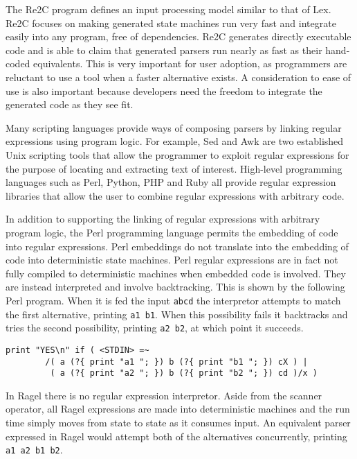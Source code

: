 \documentclass[letterpaper,11pt,oneside]{book}
\newcommand{\verbspace}{\vspace{10pt}}
\newenvironment{inline_code}{\def\baselinestretch{1}\vspace{12pt}\small}{}
\begin{document}
The Re2C program defines an input processing model similar to that of Lex.
Re2C focuses on making generated state machines run very fast and
integrate easily into any program, free of dependencies.  Re2C generates
directly executable code and is able to claim that generated parsers run nearly
as fast as their hand-coded equivalents.  This is very important for user
adoption, as programmers are reluctant to use a tool when a faster alternative
exists.  A consideration to ease of use is also important because developers
need the freedom to integrate the generated code as they see fit. 

Many scripting languages provide ways of composing parsers by linking regular
expressions using program logic. For example, Sed and Awk are two established
Unix scripting tools that allow the programmer to exploit regular expressions
for the purpose of locating and extracting text of interest. High-level
programming languages such as Perl, Python, PHP and Ruby all provide regular
expression libraries that allow the user to combine regular expressions with
arbitrary code.

In addition to supporting the linking of regular expressions with arbitrary
program logic, the Perl programming language permits the embedding of code into
regular expressions. Perl embeddings do not translate into the embedding of
code into deterministic state machines. Perl regular expressions are in fact
not fully compiled to deterministic machines when embedded code is involved.
They are instead interpreted and involve backtracking. This is shown by the
following Perl program. When it is fed the input \verb|abcd| the interpretor
attempts to match the first alternative, printing \verb|a1 b1|.  When this
possibility fails it backtracks and tries the second possibility, printing
\verb|a2 b2|, at which point it succeeds.

\begin{inline_code}
\begin{verbatim}
print "YES\n" if ( <STDIN> =~
        /( a (?{ print "a1 "; }) b (?{ print "b1 "; }) cX ) |
         ( a (?{ print "a2 "; }) b (?{ print "b2 "; }) cd )/x )
\end{verbatim}
\end{inline_code}
\verbspace

In Ragel there is no regular expression interpretor. Aside from the scanner
operator, all Ragel expressions are made into deterministic machines and the
run time simply moves from state to state as it consumes input. An equivalent
parser expressed in Ragel would attempt both of the alternatives concurrently,
printing \verb|a1 a2 b1 b2|.
\end{document}
